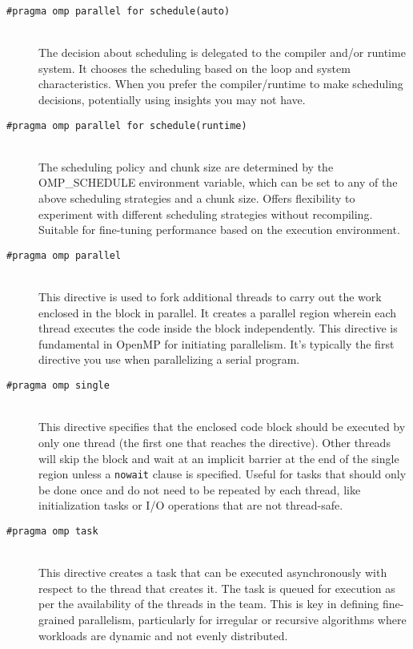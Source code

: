 \begin{description}
    \item[\texttt{\#pragma omp parallel for schedule(auto)}] \hfill \\
        The decision about scheduling is delegated to the compiler and/or runtime system. It chooses the scheduling based on the loop and system characteristics. When you prefer the compiler/runtime to make scheduling decisions, potentially using insights you may not have.
    
    \item[\texttt{\#pragma omp parallel for schedule(runtime)}] \hfill \\
        The scheduling policy and chunk size are determined by the OMP\_SCHEDULE environment variable, which can be set to any of the above scheduling strategies and a chunk size. Offers flexibility to experiment with different scheduling strategies without recompiling. Suitable for fine-tuning performance based on the execution environment.
    
    \item[\texttt{\#pragma omp parallel}] \hfill \\
        This directive is used to fork additional threads to carry out the work enclosed in the block in parallel. It creates a parallel region wherein each thread executes the code inside the block independently. This directive is fundamental in OpenMP for initiating parallelism. It's typically the first directive you use when parallelizing a serial program.
    
    \item[\texttt{\#pragma omp single}] \hfill \\
        This directive specifies that the enclosed code block should be executed by only one thread (the first one that reaches the directive). Other threads will skip the block and wait at an implicit barrier at the end of the single region unless a \texttt{nowait} clause is specified. Useful for tasks that should only be done once and do not need to be repeated by each thread, like initialization tasks or I/O operations that are not thread-safe.
\clearpage
    \item[\texttt{\#pragma omp task}] \hfill \\
        This directive creates a task that can be executed asynchronously with respect to the thread that creates it. The task is queued for execution as per the availability of the threads in the team. This is key in defining fine-grained parallelism, particularly for irregular or recursive algorithms where workloads are dynamic and not evenly distributed.
    

\end{description}
